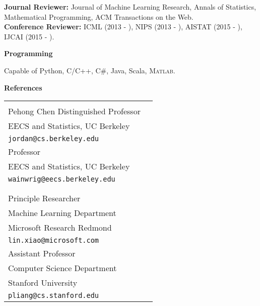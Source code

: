 \documentclass{res}
\begin{document}
\begin{resume}
\vspace{-5pt}
{\bf Journal Reviewer:} Journal of Machine Learning Research, Annals of Statistics, Mathematical Programming, ACM Transactions on the Web. \\
{\bf Conference Reviewer:} ICML (2013 - ), NIPS (2013 - ), AISTAT (2015 - ), IJCAI (2015 - ).

{\Large\bf Programming}

\vspace{-5pt}
Capable of Python, C/C++, C\#, Java, Scala, \textsc{Matlab}.

{\Large\bf References}

\begin{tabular}{ll}
\begin{minipage}{0.5\textwidth}
{\bf Michael I. Jordan}\\
Pehong Chen Distinguished Professor\\
EECS and Statistics, UC Berkeley\\
{\tt jordan@cs.berkeley.edu}
\end{minipage}&
\begin{minipage}{0.5\textwidth}
{\bf Martin J. Wainwright}\\
Professor\\
EECS and Statistics, UC Berkeley\\
{\tt wainwrig@eecs.berkeley.edu}
\end{minipage}\\\\
\begin{minipage}{0.5\textwidth}
{\bf Lin Xiao}\\
Principle Researcher\\
Machine Learning Department\\
Microsoft Research Redmond\\
{\tt lin.xiao@microsoft.com}
\end{minipage}&
\begin{minipage}{0.5\textwidth}
{\bf Percy Liang}\\
Assistant Professor\\
Computer Science Department\\
Stanford University\\
{\tt pliang@cs.stanford.edu}
\end{minipage}
\end{tabular}

\end{resume}
\end{document}
